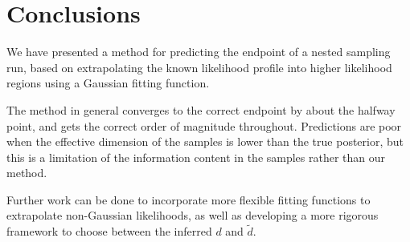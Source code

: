\documentclass[usenatbib]{mnras}
\begin{document}
\section{Conclusions}\label{sec:conclusions}
We have presented a method for predicting the endpoint of a nested sampling run, based on extrapolating the known likelihood profile into higher likelihood regions using a Gaussian fitting function.
\par
The method in general converges to the correct endpoint by about the halfway point, and gets the correct order of magnitude throughout. Predictions are poor when the effective dimension of the samples is lower than the true posterior, but this is a limitation of the information content in the samples rather than our method.
\par
Further work can be done to incorporate more flexible fitting functions to extrapolate non-Gaussian likelihoods, as well as developing a more rigorous framework to choose between the inferred $d$ and $\tilde{d}$.


% 

\appendix
\end{document}
